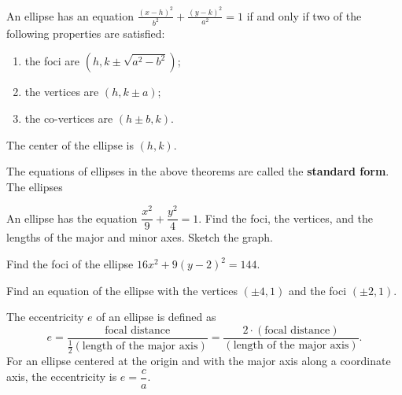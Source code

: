 \begin{theorem}
  An ellipse has an equation $\frac{(x-h)^2}{b^2}+\frac{(y-k)^2}{a^2}=1$ if and only if two of the following properties are satisfied:
  \begin{enumerate}
    \item the foci are $(h, k\pm \sqrt{a^2-b^2})$;
    \item the vertices are $(h, k\pm a)$;
    \item the co-vertices are $(h\pm b, k)$.
  \end{enumerate}
The center of the ellipse is $(h, k)$.
\end{theorem}


The equations of ellipses in the above theorems are called the \textbf{standard form}. The ellipses 

\begin{example}
An ellipse has the equation $\dfrac{x^2}{9}+\dfrac{y^2}{4}=1$.
Find the foci, the vertices, and the lengths of the major and minor axes. Sketch the graph.
\end{example}

\newpage

\begin{example}
    Find the foci of the ellipse $16x^2+9(y-2)^2=144$.
\end{example}

\begin{example}
Find an equation of the ellipse with the vertices $(\pm 4, 1)$ and the foci $(\pm 2, 1)$.
\end{example}

\begin{definition}
The eccentricity $e$ of an ellipse is defined as
\[e=\dfrac{\text{focal distance}}{\frac12\left(\text{length of the major axis}\right)}=\dfrac{2\cdot(\text{focal distance})}{\left(\text{length of the major axis}\right)}.\]
For an ellipse centered at the origin and with the major axis along a coordinate axis, the eccentricity is $e=\dfrac ca$.
\end{definition}


